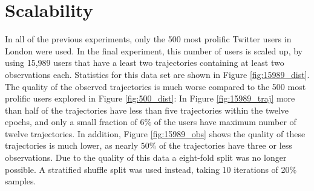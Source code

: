 
\chapter{Scalability}
\label{sec:scalability}

In all of the previous experiments, only the 500 most prolific Twitter users in London were used. In the final experiment, this number of users is scaled up, by using 15,989 users that have a least two trajectories containing at least two observations each. Statistics for this data set are shown in Figure \ref{fig:15989_dist}. The quality of the observed trajectories is  much worse compared to the 500 most prolific users explored in Figure \ref{fig:500_dist}: In Figure \ref{fig:15989_traj} more than half of the trajectories have less than five trajectories within the twelve epochs, and only a small fraction of $6\%$ of the users have maximum number of twelve trajectories. In addition, Figure \ref{fig:15989_obs} shows the quality of these trajectories is much lower, as nearly $50\%$ of the trajectories have three or less observations. Due to the quality of this data a eight-fold split was no longer possible. A stratified shuffle split was used instead, taking 10 iterations of 20\% samples.

